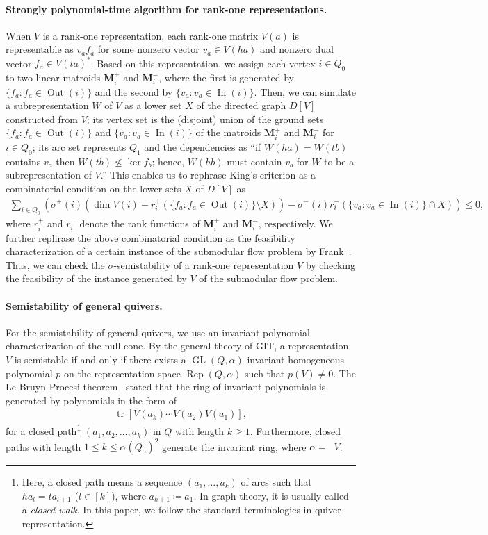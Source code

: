 \documentclass[a4paper,11pt]{article}
\numberwithin{equation}{section}
\newcommand{\M}{\mathbf{M}}
\DeclareMathOperator{\GL}{GL}
\DeclareMathOperator{\Rep}{Rep}
\DeclareMathOperator{\In}{In}
\DeclareMathOperator{\Out}{Out}
\DeclareMathOperator{\tr}{tr}
\DeclareMathOperator{\dimv}{\underline{dim}}
\begin{document}
\paragraph{Strongly polynomial-time algorithm for rank-one representations.}
When $V$ is a rank-one representation,
each rank-one matrix $V(a)$ is representable as $v_a f_a$ for some nonzero vector $v_a \in V(ha)$ and nonzero dual vector $f_a \in V(ta)^*$.
Based on this representation, we assign each vertex $i \in Q_0$ to two linear matroids $\M_i^+$ and $\M_i^-$,
where the first is generated by $\{ f_a : f_a \in \Out(i) \}$
and the second by $\{ v_a : v_a \in \In(i) \}$.
Then, we can simulate a subrepresentation $W$ of $V$ as a lower set $X$ of the directed graph $D[V]$ constructed from $V$;
its vertex set is the (disjoint) union of the ground sets
$\{ f_a : f_a \in \Out(i) \}$
and $\{ v_a : v_a \in \In(i) \}$
of the matroids $\M_i^+$ and $\M_i^-$ for $i \in Q_0$;
its arc set represents $Q_1$ and the dependencies as
``if $W(ha) = W(tb)$ contains $v_a$ then $W(tb) \not\leq \ker f_b$; hence, $W(hb)$ must contain $v_b$ for $W$ to be a subrepresentation of $V$.''
This enables us to rephrase King's criterion as a combinatorial condition on the lower sets $X$ of $D[V]$ as
\begin{align}
    \sum_{i \in Q_0} \left( \sigma^+(i) \left(\dim V(i) - r_i^+(\{ f_a : f_a \in \Out(i) \} \setminus X) \right) - \sigma^-(i) r_i^-(\{ v_a : v_a \in \In(i) \} \cap X) \right) \leq 0,
\end{align}
where $r_i^+$ and $r_i^-$ denote the rank functions of $\M_i^+$ and $\M_i^-$,
respectively.
We further rephrase the above combinatorial condition as
the feasibility characterization of a certain instance of the submodular flow problem by Frank~\cite{Frank1984}.
Thus, we can check the $\sigma$-semistability of a rank-one representation $V$ by
checking the feasibility of the instance generated by $V$ of the submodular flow problem.


\paragraph{Semistability of general quivers.}
For the semistability of general quivers, we use an invariant polynomial characterization of the null-cone.
By the general theory of GIT, a representation $V$ is semistable if and only if there exists a $\GL(Q,\alpha)$-invariant homogeneous polynomial $p$ on the representation space $\Rep(Q, \alpha)$ such that $p(V) \neq 0$.
The Le Bruyn-Procesi theorem~\cite{Bruyn1990} stated that the ring of invariant polynomials is generated by polynomials in the form of
\begin{align}
    \tr[V(a_k)\cdots V(a_2)V(a_1)],
\end{align}
for a closed path\footnote{Here, a closed path means a sequence $(a_1, \dots, a_k)$ of arcs such that $ha_l = ta_{l+1}$ ($l \in [k]$), where $a_{k+1} \coloneqq a_1$. In graph theory, it is usually called a \emph{closed walk}. In this paper, we follow the standard terminologies in quiver representation.} $(a_1, a_2, \dots, a_k)$ in $Q$ with length $k \ge 1$.
Furthermore, closed paths with length $1 \le k \leq \alpha(Q_0)^2$ generate the invariant ring, where $\alpha = \dimv V$.
\end{document}
